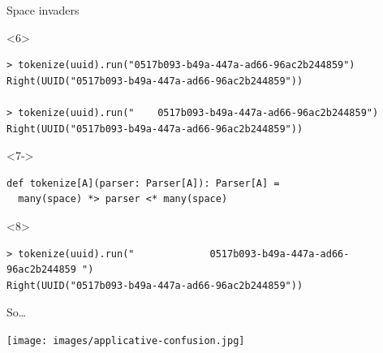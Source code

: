 \documentclass[presentation,aspectratio=169,smaller]{beamer}
\begin{document}
\begin{frame}[label={sec:org324abf0},fragile,t]{Space invaders}
\begin{onlyenv}<6>
\begin{verbatim}
> tokenize(uuid).run("0517b093-b49a-447a-ad66-96ac2b244859")
Right(UUID("0517b093-b49a-447a-ad66-96ac2b244859"))

> tokenize(uuid).run("    0517b093-b49a-447a-ad66-96ac2b244859")
Right(UUID("0517b093-b49a-447a-ad66-96ac2b244859"))
\end{verbatim}
\end{onlyenv}

\begin{onlyenv}<7->
\begin{verbatim}
def tokenize[A](parser: Parser[A]): Parser[A] =
  many(space) *> parser <* many(space)
\end{verbatim}
\end{onlyenv}

\begin{onlyenv}<8>
\begin{verbatim}
> tokenize(uuid).run("             0517b093-b49a-447a-ad66-96ac2b244859 ")
Right(UUID("0517b093-b49a-447a-ad66-96ac2b244859"))
\end{verbatim}
\end{onlyenv}
\end{frame}

\begin{frame}[label={sec:org1ed9131}]{So\ldots{}}
\begin{center}
\texttt{[image: images/applicative-confusion.jpg]}
\end{center}
\end{frame}
\end{document}

